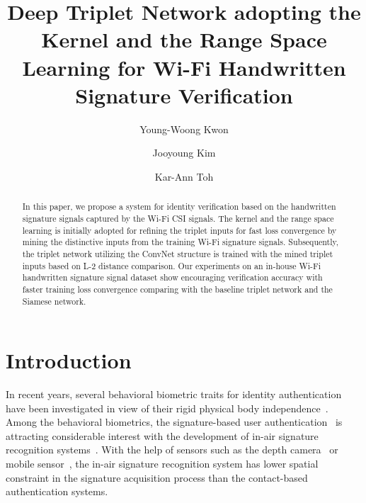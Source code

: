 \documentclass[runningheads]{llncs}
\begin{document}
%
\title{Deep Triplet Network adopting the Kernel and the Range Space Learning for Wi-Fi Handwritten Signature Verification}
%
%
\author{Young-Woong Kwon \and Jooyoung Kim \and Kar-Ann Toh}
%
%
%
\maketitle              %
%
\begin{abstract}
In this paper, we propose a system for identity verification based on the handwritten signature signals captured by the Wi-Fi CSI signals. 
The kernel and the range space learning is initially adopted for refining the triplet inputs for fast loss convergence by mining the distinctive inputs from the training Wi-Fi signature signals. 
Subsequently, the triplet network utilizing the ConvNet structure is trained with the mined triplet inputs based on L-2 distance comparison. 
Our experiments on an in-house Wi-Fi handwritten signature signal dataset show encouraging verification accuracy with faster training loss convergence comparing with the baseline triplet network and the Siamese network.

\end{abstract}
%
%
%
\section{Introduction}

In recent years, several behavioral biometric traits for identity authentication have been investigated in view of their rigid physical body independence~\cite{bailador2011analysis}. Among the behavioral biometrics, the signature-based user authentication~\cite{sanmorino2012survey,galbally2015line} is attracting considerable interest with the development of in-air signature recognition systems~\cite{jeon2012system,sesa2012information,malik20183dairsig}.
With the help of sensors such as the depth camera~\cite{malik20183dairsig} or mobile sensor~\cite{jeon2012system}, the in-air signature recognition system has lower spatial constraint in the signature acquisition process than the contact-based authentication systems. 
\end{document}
